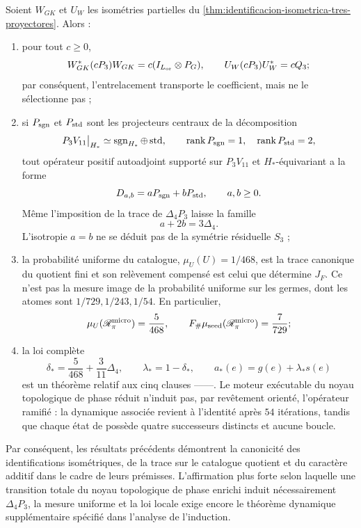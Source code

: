 \begin{theorem}
\label{p3-20260826:thm:alcance-induccion-accion}
Soient \(W_{GK}\) et \(U_W\) les isométries partielles du
\cref{thm:identificacion-isometrica-tres-proyectores}. Alors :
\begin{enumerate}
  \item pour tout \(c\geq0\),
  \[
   W_{GK}^{*}(cP_3)W_{GK}
   =c(I_{L_{\rm or}}\otimes P_G),
   \qquad
   U_W(cP_3)U_W^{*}=cQ_3;
  \]
  par conséquent, l’entrelacement transporte le coefficient, mais ne le
  sélectionne pas ;
  \item si \(P_{\rm sgn}\) et \(P_{\rm std}\) sont les projecteurs centraux
  de la décomposition
  \[
   P_3V_{11}\big|_{H_*}
   \simeq \operatorname{sgn}_{H_*}\oplus\operatorname{std},
   \qquad
   \operatorname{rank}P_{\rm sgn}=1,
   \quad
   \operatorname{rank}P_{\rm std}=2,
  \]
  tout opérateur positif autoadjoint supporté sur \(P_3V_{11}\) et
  \(H_*\)-équivariant a la forme
  \[
   D_{a,b}=aP_{\rm sgn}+bP_{\rm std},
   \qquad a,b\geq0.
  \]
  Même l’imposition de la trace de \(\Delta_4P_3\) laisse la famille
  \[
   a+2b=3\Delta_4.
  \]
  L’isotropie \(a=b\) ne se déduit pas de la symétrie résiduelle \(S_3\) ;
  \item la probabilité uniforme du catalogue,
  \(\mu_U(U)=1/468\), est la trace canonique du quotient fini et son
  relèvement compensé est celui que détermine \(J_F\). Ce n’est pas la
  mesure image de la probabilité uniforme sur les germes, dont les atomes sont
  \(1/729,1/243,1/54\). En particulier,
  \[
   \mu_U(\mathscr R_\pi^{\rm micro})=\frac5{468},
   \qquad
   F_\#\mu_{\rm seed}(\mathscr R_\pi^{\rm micro})=\frac7{729};
  \]
  \item la loi complète
  \[
   \delta_*=\frac5{468}+\frac3{11}\Delta_4,
   \qquad
   \lambda_*=1-\delta_*,
   \qquad
   a_*(e)=g(e)+\lambda_*s(e)
  \]
  est un théorème relatif aux cinq clauses \HTr--\HAdd--\HDef--\HRes--\HLoc. Le moteur
  exécutable du noyau topologique de phase réduit n’induit pas, par revêtement orienté, l’opérateur ramifié
  \Gtr : la dynamique associée revient à l’identité après \(54\) itérations,
  tandis que chaque état de
  \Gtr possède quatre successeurs distincts et aucune boucle.
\end{enumerate}
Par conséquent, les résultats précédents démontrent la canonicité des identifications
isométriques, de la trace sur le catalogue quotient et du caractère additif
dans le cadre de leurs prémisses. L’affirmation plus forte selon laquelle une transition totale
du noyau topologique de phase enrichi induit nécessairement \(\Delta_4P_3\), la mesure uniforme et la
loi locale exige encore le théorème dynamique supplémentaire spécifié dans
l’analyse de l’induction.
\end{theorem}

